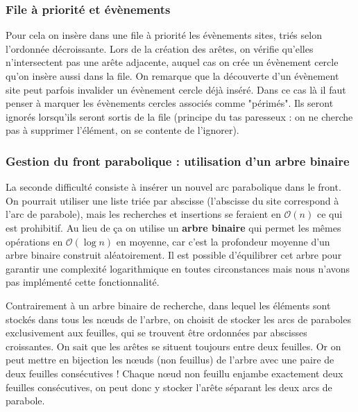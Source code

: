 \documentclass[a4paper, 10pt]{article}
\begin{document}
\subsubsection{File à priorité et évènements}  
  
Pour cela on insère dans une file à priorité les évènements sites, triés selon l'ordonnée décroissante. Lors de la création des arêtes, on vérifie qu'elles n'intersectent pas une arête adjacente, auquel cas on crée un évènement cercle qu'on insère aussi dans la file. On remarque que la découverte d'un évènement site peut parfois invalider un évènement cercle déjà inséré. Dans ce cas là il faut penser à marquer les évènements cercles associés comme "périmés". Ils seront ignorés lorsqu'ils seront sortis de la file (principe du tas paresseux : on ne cherche pas à supprimer l'élément, on se contente de l'ignorer).  
  
\subsubsection{Gestion du front parabolique : utilisation d'un arbre binaire}  
  
La seconde difficulté consiste à insérer un nouvel arc parabolique dans le front. On pourrait utiliser une liste triée par abscisse (l'abscisse du site correspond à l'arc de parabole), mais les recherches et insertions se feraient en $\mathcal{O}(n)$ ce qui est prohibitif. Au lieu de ça on utilise un \textbf{arbre binaire} qui permet les mêmes opérations en $\mathcal{O}(\log{n})$ en moyenne, car c'est la profondeur moyenne d'un arbre binaire construit aléatoirement. Il est possible d'équilibrer cet arbre pour garantir une complexité logarithmique en toutes circonstances mais nous n'avons pas implémenté cette fonctionnalité.  
  
Contrairement à un arbre binaire de recherche, dans lequel les éléments sont stockés dans tous les nœuds de l'arbre, on choisit de stocker les arcs de paraboles exclusivement aux feuilles, qui se trouvent être ordonnées par abscisses croissantes. On sait que les arêtes se situent toujours entre deux feuilles. Or on peut mettre en bijection les nœuds (non feuillus) de l'arbre avec une paire de deux feuilles consécutives ! Chaque nœud non feuillu enjambe exactement deux feuilles consécutives, on peut donc y stocker l'arête séparant les deux arcs de parabole.  
  
\end{document}
